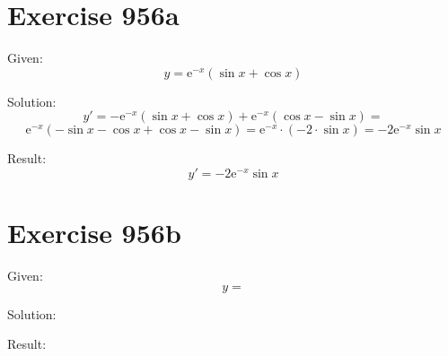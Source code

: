 \documentclass[a4paper, 10pt]{scrartcl}
\newcommand*\euler{\mathrm{e}}
\begin{document}
\section{Exercise 956a}

Given:
\[
y = \euler^{-x}(\sin{x} + \cos{x})
\]

Solution:
\[
y' = -\euler^{-x}(\sin{x} + \cos{x}) + \euler^{-x}(\cos{x} - \sin{x}) =
\]
\[
\euler^{-x}(-\sin{x} - \cos{x} + \cos{x} - \sin{x}) = \euler^{-x}\cdot(-2\cdot\sin{x}) = -2\euler^{-x}\sin{x}
\]

Result:
\[
y' = -2\euler^{-x}\sin{x}
\]

\section{Exercise 956b}

Given:
\[
y = 
\]

Solution:

Result:
\end{document}
